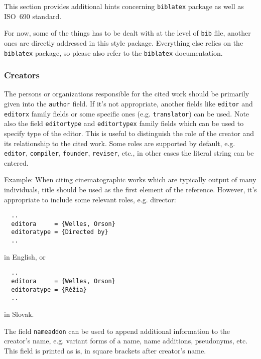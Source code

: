 \documentclass[a4paper,10pt]{ltxdockit}
\def\t|#1|{\texttt{#1}}
\begin{document}
This section provides additional hints concerning \t|biblatex| package
as well as ISO~690 standard.

For now, some of the things has to be dealt with at the level of \t|bib|
file, another ones are directly addressed in this style package.
Everything else relies on the \t|biblatex| package, so please also refer
to the \t|biblatex| documentation.

\subsubsection{Creators}

The persons or organizations responsible for the cited work should be
primarily given into the \t|author| field. If it's not appropriate,
another fields like \t|editor| and \t|editorx| family fields or some
specific ones (e.g. \t|translator|) can be used. Note also the field
\t|editortype| and \t|editortypex| family fields which can be used
to specify type of the editor. This is useful to distinguish the role
of the creator and its relationship to the cited work. Some roles
are supported by default, e.g. \t|editor|, \t|compiler|, \t|founder|,
\t|reviser|, etc., in other cases the literal string can be entered.

Example:
When citing cinematographic works which are typically output of many
individuals, title should be used as the first element of the reference.
However, it's appropriate to include some relevant roles, e.g. director:

\begin{verbatim}
  ..
  editora     = {Welles, Orson}
  editoratype = {Directed by}
  ..
\end{verbatim}

in English, or

\begin{verbatim}
  ..
  editora     = {Welles, Orson}
  editoratype = {Réžia}
  ..
\end{verbatim}

in Slovak.

The field \t|nameaddon| can be used to append additional information
to the creator's name, e.g. variant forms of a name, name additions,
pseudonyms, etc. This field is printed as is, in square brackets after
creator's name.
\end{document}
